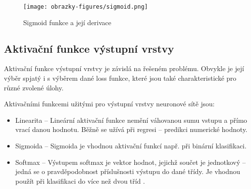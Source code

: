 \begin{figure}[!htbp]
    \centering
    \texttt{[image: obrazky-figures/sigmoid.png]}
    \caption{Sigmoid funkce a její derivace \cite{VanishingGradientProblem}}
    \label{fig:sigmoid}
\end{figure}



\subsection*{Aktivační funkce výstupní vrstvy}
Aktivační funkce výstupní vrstvy je závislá na řešeném problému. Obvykle je její výběr spjatý i s výběrem dané loss funkce, které jsou také charakteristické pro různé zvolené úlohy.

Aktivačními funkcemi užitými pro výstupní vrstvy neuronové sítě jsou:
\begin{itemize}
    \item Linearita -- Lineární aktivační funkce nemění váhovanou sumu vstupu a přímo vrací danou hodnotu. Běžně se užívá při regresi -- predikci numerické hodnoty.
    \item Sigmoida -- Sigmoida je vhodnou aktivační funkcí např. při binární klasifikaci.
    \item Softmax -- Výstupem softmax je vektor hodnot, jejichž součet je jednotkový -- jedná se o pravděpodobnost příslušnosti výstupu do dané třídy. Je vhodnou použít při klasifikaci do více než dvou tříd \cite{HowToChooseActivationFunction}. 
\end{itemize}


